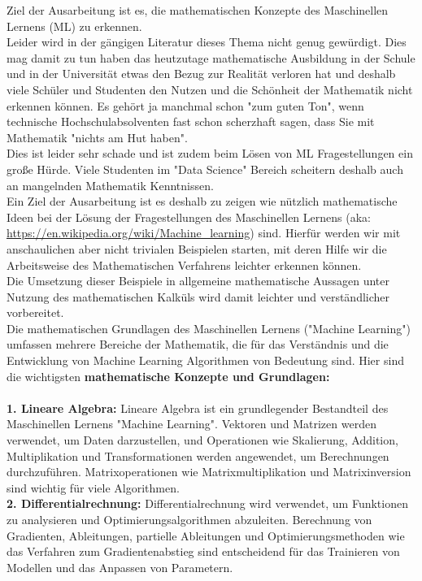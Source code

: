 \documentclass[12pt]{article}
\begin{document}
Ziel der Ausarbeitung ist es, die {\color{blue}mathematischen Konzepte des Maschinellen Lernens (ML)} zu erkennen.\\
Leider wird in der gängigen Literatur dieses Thema nicht genug gewürdigt. Dies mag damit zu tun haben das heutzutage mathematische Ausbildung in der Schule und in der Universität etwas den Bezug zur Realität verloren hat und deshalb viele Schüler und Studenten den Nutzen und die Schönheit der Mathematik nicht erkennen können. Es gehört ja manchmal schon "zum guten Ton", wenn technische Hochschulabsolventen fast schon scherzhaft sagen, dass Sie mit Mathematik "nichts am Hut haben".\\
Dies ist leider sehr schade und ist zudem beim Lösen von ML Fragestellungen ein große Hürde. Viele Studenten im "Data Science" Bereich scheitern deshalb auch an mangelnden Mathematik Kenntnissen.\\[0.2cm]
%
Ein Ziel der Ausarbeitung ist es deshalb zu zeigen wie nützlich mathematische Ideen bei der Lösung der Fragestellungen des Maschinellen Lernens (aka: \url{https://en.wikipedia.org/wiki/Machine_learning}) sind.
Hierfür werden wir mit anschaulichen aber nicht trivialen Beispielen starten, mit deren Hilfe wir die Arbeitsweise des Mathematischen Verfahrens leichter erkennen können.\\
Die Umsetzung dieser Beispiele in allgemeine mathematische Aussagen unter  Nutzung des mathematischen Kalküls wird damit leichter und verständlicher vorbereitet.\\[0.2cm]
Die mathematischen Grundlagen des Maschinellen Lernens ("Machine Learning")  umfassen mehrere Bereiche der Mathematik, die für das Verständnis und die Entwicklung von Machine Learning Algorithmen von Bedeutung sind.
Hier sind die wichtigsten \textbf{mathematische Konzepte und Grundlagen:}\\
\\
\textbf{1. Lineare Algebra:} Lineare Algebra ist ein grundlegender Bestandteil des Maschinellen Lernens "Machine Learning". Vektoren und Matrizen werden verwendet, um Daten darzustellen, und Operationen wie Skalierung, Addition, Multiplikation und Transformationen werden angewendet, um Berechnungen durchzuführen. Matrixoperationen wie Matrixmultiplikation und Matrixinversion sind wichtig für viele Algorithmen.\\[0.2cm]
%
\textbf{2. Differentialrechnung:} Differentialrechnung wird verwendet, um Funktionen zu analysieren und Optimierungsalgorithmen abzuleiten. Berechnung von Gradienten, Ableitungen, partielle Ableitungen und Optimierungsmethoden wie das Verfahren zum Gradientenabstieg sind entscheidend für das Trainieren von Modellen und das Anpassen von Parametern.\\[0.2cm]
\end{document}
